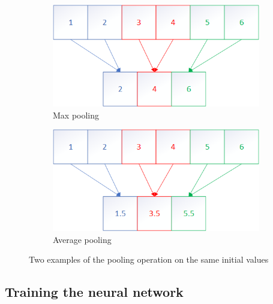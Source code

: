 \begin{figure}
    \centering
    \begin{subfigure}[b]{.45\textwidth}
        \centering
        \includegraphics[width=\textwidth]{figures/maxpooling.png}
        \caption{Max pooling}
        \label{sfig:maxpoolexample}
    \end{subfigure}
    \hfill
    \begin{subfigure}[b]{.45\textwidth}
        \centering
        \includegraphics[width=\textwidth]{figures/avgpooling.png}
        \caption{Average pooling}
        \label{sfig:avgpoolexample}
    \end{subfigure}
    \caption{Two examples of the pooling operation on the same initial values}
    \label{fig:poolexample}
\end{figure}


\subsection{Training the neural network}

